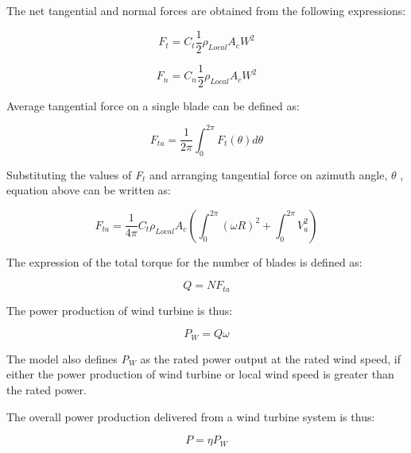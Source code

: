 The net tangential and normal forces are obtained from the following expressions:

\begin{equation}
{F_t} = {C_t}\frac{1}{2}{\rho_{Local}}{A_c}{W^2}
\end{equation}

\begin{equation}
{F_n} = {C_n}\frac{1}{2}{\rho_{Local}}{A_c}{W^2}
\end{equation}

Average tangential force on a single blade can be defined as:

\begin{equation}
{F_{ta}} = \frac{1}{{2\pi }}\int_0^{2\pi } {{F_t}(\theta )d\theta }
\end{equation}

Substituting the values of \emph{F\(_{t}\)} and arranging tangential force on azimuth angle, \(\theta\) , equation above can be written as:

\begin{equation}
{F_{ta}} = \frac{1}{{4\pi }}{C_t}{\rho_{Local}}{A_c}(\int_0^{2\pi } {{{(\omega R)}^2}}  + \int_0^{2\pi } {V_a^2} )
\end{equation}

The expression of the total torque for the number of blades is defined as:

\begin{equation}
Q = N{F_{ta}}
\end{equation}

The power production of wind turbine is thus:

\begin{equation}
{P_W} = Q\omega
\end{equation}

The model also defines \emph{P\(_{W}\)} as the rated power output at the rated wind speed, if either the power production of wind turbine or local wind speed is greater than the rated power.

The overall power production delivered from a wind turbine system is thus:

\begin{equation}
P = \eta {P_W}
\end{equation}

